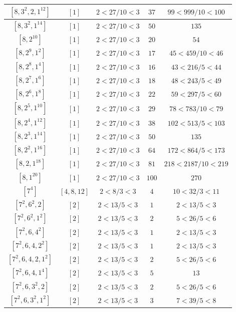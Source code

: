 \documentclass{article}%
\begin{document}
\begin{center}
\begin{longtable}{||c|c|c|c|c||}
$[8, 3^{2}, 2, 1^{12}]$ & $[1]$ & $2 < 27/10 < 3$ & $37$ & $99 < 999/10 < 100$ \\ \hline 
$[8, 3^{2}, 1^{14}]$ & $[1]$ & $2 < 27/10 < 3$ & $50$ & $135$ \\ \hline 
$[8, 2^{10}]$ & $[1]$ & $2 < 27/10 < 3$ & $20$ & $54$ \\ \hline 
$[8, 2^{9}, 1^{2}]$ & $[1]$ & $2 < 27/10 < 3$ & $17$ & $45 < 459/10 < 46$ \\ \hline 
$[8, 2^{8}, 1^{4}]$ & $[1]$ & $2 < 27/10 < 3$ & $16$ & $43 < 216/5 < 44$ \\ \hline 
$[8, 2^{7}, 1^{6}]$ & $[1]$ & $2 < 27/10 < 3$ & $18$ & $48 < 243/5 < 49$ \\ \hline 
$[8, 2^{6}, 1^{8}]$ & $[1]$ & $2 < 27/10 < 3$ & $22$ & $59 < 297/5 < 60$ \\ \hline 
$[8, 2^{5}, 1^{10}]$ & $[1]$ & $2 < 27/10 < 3$ & $29$ & $78 < 783/10 < 79$ \\ \hline 
$[8, 2^{4}, 1^{12}]$ & $[1]$ & $2 < 27/10 < 3$ & $38$ & $102 < 513/5 < 103$ \\ \hline 
$[8, 2^{3}, 1^{14}]$ & $[1]$ & $2 < 27/10 < 3$ & $50$ & $135$ \\ \hline 
$[8, 2^{2}, 1^{16}]$ & $[1]$ & $2 < 27/10 < 3$ & $64$ & $172 < 864/5 < 173$ \\ \hline 
$[8, 2, 1^{18}]$ & $[1]$ & $2 < 27/10 < 3$ & $81$ & $218 < 2187/10 < 219$ \\ \hline 
$[8, 1^{20}]$ & $[1]$ & $2 < 27/10 < 3$ & $100$ & $270$ \\ \hline 
$[7^{4}]$ & $[4, 8, 12]$ & $2 < 8/3 < 3$ & $4$ & $10 < 32/3 < 11$ \\ \hline 
$[7^{2}, 6^{2}, 2]$ & $[2]$ & $2 < 13/5 < 3$ & $1$ & $2 < 13/5 < 3$ \\ \hline 
$[7^{2}, 6^{2}, 1^{2}]$ & $[2]$ & $2 < 13/5 < 3$ & $2$ & $5 < 26/5 < 6$ \\ \hline 
$[7^{2}, 6, 4^{2}]$ & $[2]$ & $2 < 13/5 < 3$ & $1$ & $2 < 13/5 < 3$ \\ \hline 
$[7^{2}, 6, 4, 2^{2}]$ & $[2]$ & $2 < 13/5 < 3$ & $1$ & $2 < 13/5 < 3$ \\ \hline 
$[7^{2}, 6, 4, 2, 1^{2}]$ & $[2]$ & $2 < 13/5 < 3$ & $2$ & $5 < 26/5 < 6$ \\ \hline 
$[7^{2}, 6, 4, 1^{4}]$ & $[2]$ & $2 < 13/5 < 3$ & $5$ & $13$ \\ \hline 
$[7^{2}, 6, 3^{2}, 2]$ & $[2]$ & $2 < 13/5 < 3$ & $2$ & $5 < 26/5 < 6$ \\ \hline 
$[7^{2}, 6, 3^{2}, 1^{2}]$ & $[2]$ & $2 < 13/5 < 3$ & $3$ & $7 < 39/5 < 8$ \\ \hline 

\end{longtable}
\end{center}
\end{document}
